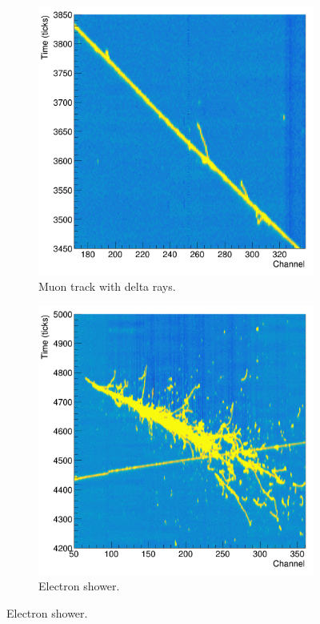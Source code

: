 \begin{figure}

	\centering

	\begin{subfigure}[b]{0.49\textwidth}
		\centering
		\includegraphics[width=\textwidth]{figures/muon_signature.png}
		\caption{Muon track with delta rays.}
		\label{fig:muon_signature}
	\end{subfigure}
	\hfill
	\begin{subfigure}[b]{0.49\textwidth}
		\centering
		\includegraphics[width=\textwidth]{figures/electron_signature.png}
		\caption{Electron shower.}
		\label{fig:electron_signature}
	\end{subfigure}


\end{figure}
